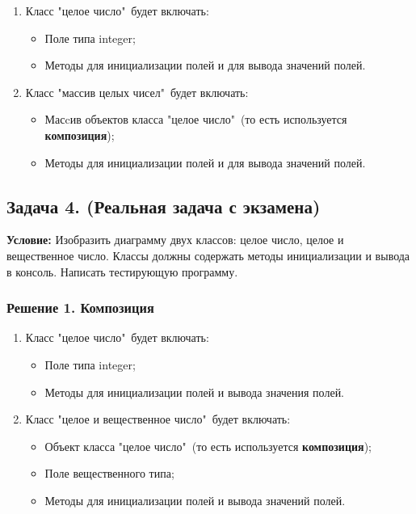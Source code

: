 \begin{enumerate}
\item Класс "целое число"\ будет включать:
\begin{itemize}
    \item Поле типа integer;
    \item Методы для инициализации полей и для вывода значений полей.
\end{itemize}

\item Класс "массив целых чисел"\ будет включать:
\begin{itemize}
    \item Масcив объектов класса "целое число"\ (то есть используется {\bf композиция});
    \item Методы для инициализации полей и для вывода значений полей.
\end{itemize}
\end{enumerate}

{}


{}



\newpage\subsection{Задача 4. (Реальная задача с экзамена)}
{\bf Условие:} Изобразить диаграмму двух классов: целое число, целое и вещественное число. Классы должны содержать методы инициализации и вывода в консоль. Написать тестирующую программу.


\subsubsection{Решение 1. Композиция}

\begin{enumerate}
\item Класс "целое число"\ будет включать:
\begin{itemize}
    \item Поле типа integer;
    \item Методы для инициализации полей и вывода значения полей.
\end{itemize}

\item Класс "целое и вещественное число"\ будет включать:
\begin{itemize}
    \item Объект класса "целое число"\ (то есть используется {\bf композиция});
    \item Поле вещественного типа;
    \item Методы для инициализации полей и вывода значений полей.
\end{itemize}
\end{enumerate}

